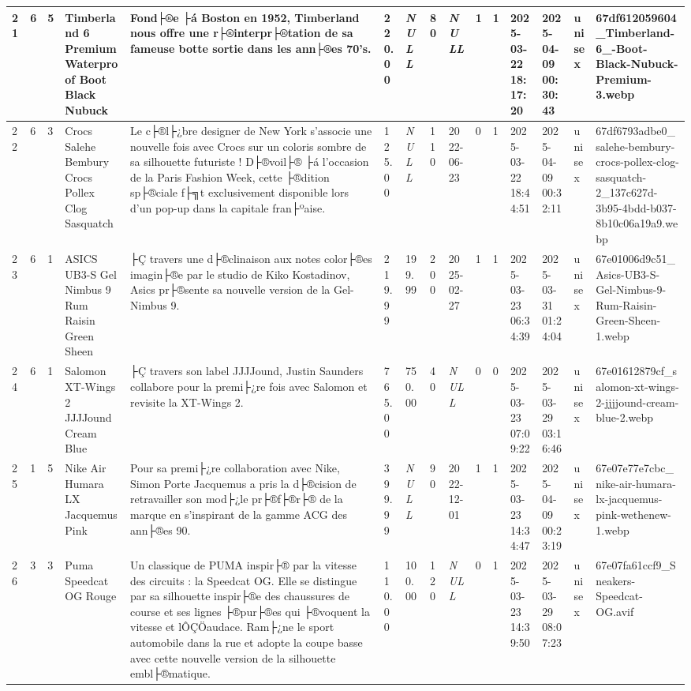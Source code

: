 \begin{longtable}{|l|l|l|l|l|l|l|l|l|l|l|l|l|l|l|}
21 & 6 & 5 & Timberland 6 Premium Waterproof Boot Black Nubuck & Fond├®e ├á Boston en 1952, Timberland nous offre une r├®interpr├®tation de sa fameuse botte sortie dans les ann├®es 70's. & 220.00 & \textit{NULL} & 80 & \textit{NULL} & 1 & 1 & 2025-03-22 18:17:20 & 2025-04-09 00:30:43 & unisex & 67df612059604\_Timberland-6\_-Boot-Black-Nubuck-Premium-3.webp \\ \hline 
22 & 6 & 3 & Crocs Salehe Bembury Crocs Pollex Clog Sasquatch & Le c├®l├¿bre designer de New York s'associe une nouvelle fois avec Crocs sur un coloris sombre de sa silhouette futuriste ! D├®voil├® ├á l'occasion de la Paris Fashion Week, cette ├®dition sp├®ciale f├╗t exclusivement disponible lors d'un pop-up dans la capitale fran├ºaise. & 125.00 & \textit{NULL} & 110 & 2022-06-23 & 0 & 1 & 2025-03-22 18:44:51 & 2025-04-09 00:32:11 & unisex & 67df6793adbe0\_salehe-bembury-crocs-pollex-clog-sasquatch-2\_137c627d-3b95-4bdd-b037-8b10c06a19a9.webp \\ \hline 
23 & 6 & 1 & ASICS UB3-S Gel Nimbus 9 Rum Raisin Green Sheen & ├Ç travers une d├®clinaison aux notes color├®es imagin├®e par le studio de Kiko Kostadinov, Asics pr├®sente sa nouvelle version de la Gel-Nimbus 9. & 219.99 & 199.99 & 200 & 2025-02-27 & 1 & 1 & 2025-03-23 06:34:39 & 2025-03-31 01:24:04 & unisex & 67e01006d9c51\_Asics-UB3-S-Gel-Nimbus-9-Rum-Raisin-Green-Sheen-1.webp \\ \hline 
24 & 6 & 1 & Salomon XT-Wings 2 JJJJound Cream Blue & ├Ç travers son label JJJJound, Justin Saunders collabore pour la premi├¿re fois avec Salomon et revisite la XT-Wings 2. & 765.00 & 750.00 & 40 & \textit{NULL} & 0 & 0 & 2025-03-23 07:09:22 & 2025-03-29 03:16:46 & unisex & 67e01612879cf\_salomon-xt-wings-2-jjjjound-cream-blue-2.webp \\ \hline 
25 & 1 & 5 & Nike Air Humara LX Jacquemus Pink & Pour sa premi├¿re collaboration avec Nike, Simon Porte Jacquemus a pris la d├®cision de retravailler son mod├¿le pr├®f├®r├® de la marque en s'inspirant de la gamme ACG des ann├®es 90. & 399.99 & \textit{NULL} & 90 & 2022-12-01 & 1 & 1 & 2025-03-23 14:34:47 & 2025-04-09 00:23:19 & unisex & 67e07e77e7cbc\_nike-air-humara-lx-jacquemus-pink-wethenew-1.webp \\ \hline 
26 & 3 & 3 & Puma Speedcat OG Rouge & Un classique de PUMA inspir├® par la vitesse des circuits : la Speedcat OG. Elle se distingue par sa silhouette inspir├®e des chaussures de course et ses lignes ├®pur├®es qui ├®voquent la vitesse et lÔÇÖaudace. Ram├¿ne le sport automobile dans la rue et adopte la coupe basse avec cette nouvelle version de la silhouette embl├®matique. & 110.00 & 100.00 & 120 & \textit{NULL} & 0 & 1 & 2025-03-23 14:39:50 & 2025-03-29 08:07:23 & unisex & 67e07fa61ccf9\_Sneakers-Speedcat-OG.avif \\ \hline 

\end{longtable}
